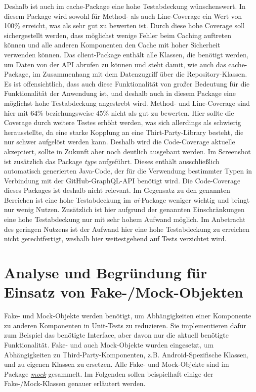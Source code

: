 Deshalb ist  auch im cache-Package eine hohe Testabdeckung wünschenswert.
In diesem Package wird sowohl für Method- als auch Line-Coverage ein Wert von 100\% erreicht, was als sehr gut zu bewerten ist.
Durch diese hohe Coverage soll sichergestellt werden, dass möglichst wenige Fehler beim Caching auftreten können und alle anderen Komponenten den Cache mit hoher Sicherheit verwenden können.
\newline
\newline
Das client-Package enthält alle Klassen, die benötigt werden, um Daten von der API abrufen zu können und steht damit, wie auch das cache-Package, im Zusammenhang mit dem Datenzugriff über die Repository-Klassen.
Es ist offensichtlich, dass auch diese Funktionalität von großer Bedeutung für die Funktionalität der Anwendung ist, und deshalb auch in diesem Package eine möglichst hohe Testabdeckung angestrebt wird.
Method- und Line-Coverage sind hier mit 64\% beziehungsweise 45\% nicht als gut zu bewerten.
Hier sollte die Coverage durch weitere Testes erhöht werden, was sich allerdings als schwierig herausstellte, da eine starke Kopplung an eine Thirt-Party-Library besteht, die nur schwer aufgelöst werden kann.
Deshalb wird die Code-Coverage aktuelle akzeptiert, sollte in Zukunft aber noch deutlich ausgebaut werden.
\newline
\newline
Im Screenshot ist zusätzlich das Package \textit{type} aufgeführt.
Dieses enthält ausschließlich automatisch generierten Java-Code, der für die Verwendung bestimmter Typen in Verbindung mit der GitHub-GraphQL-API benötigt wird.
Die Code-Coverage dieses Packages ist deshalb nicht relevant.
\newline
\newline
Im Gegensatz zu den genannten Bereichen ist eine hohe Testabdeckung im \textit{ui}-Package weniger wichtig und bringt nur wenig Nutzen. 
Zusätzlich ist hier aufgrund der genannten Einschränkungen eine hohe Testabdeckung nur mit sehr hohem Aufwand möglich.
Im Anbetracht des geringen Nutzens ist der Aufwand hier eine hohe Testabdeckung zu erreichen nicht gerechtfertigt, weshalb hier weitestgehend auf Tests verzichtet wird.

\newpage
\section{Analyse und Begründung für Einsatz von Fake-/Mock-Objekten}

Fake- und Mock-Objekte werden benötigt, um Abhängigkeiten einer Komponente zu anderen Komponenten in Unit-Tests zu reduzieren.
Sie implementieren dafür zum Beispiel das benötigte Interface, aber davon nur die aktuell benötigte Funktionalität.
Fake- und auch Mock-Objekte wurden eingesetzt, um Abhängigkeiten zu Third-Party-Komponenten, z.B. Android-Spezifische Klassen, und zu eigenen Klassen zu ersetzen.
Alle Fake- und Mock-Objekte sind im Package \textit{\href{https://github.com/lukaspanni/OpenSourceStats/tree/main/app/src/test/java/de/lukaspanni/opensourcestats/mock}{mock}} gesammelt.
\newline
Im Folgenden sollen beispielhaft einige der Fake-/Mock-Klassen genauer erläutert werden.
\newpage
